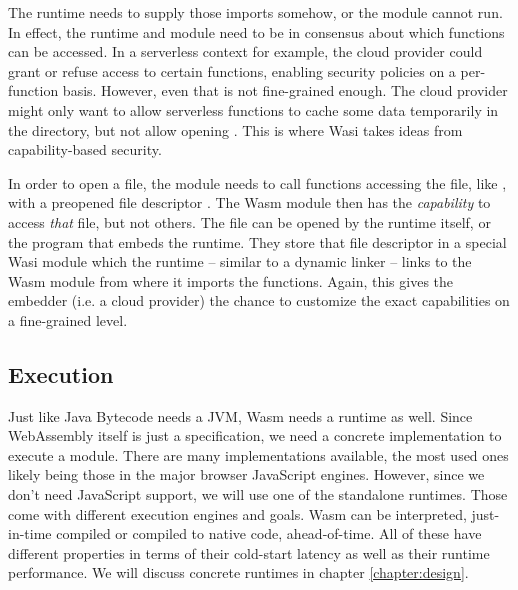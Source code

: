 The runtime needs to supply those imports somehow, or the module cannot run. In effect, the runtime and module need to be in consensus about which functions can be accessed. In a serverless context for example, the cloud provider could grant or refuse access to certain functions, enabling security policies on a per-function basis. However, even that is not fine-grained enough. The cloud provider might only want to allow serverless functions to cache some data temporarily in the  directory, but not allow opening . This is where Wasi takes ideas from capability-based security.

In order to open a file, the module needs to call functions accessing the file, like , with a preopened file descriptor \cite{Clark2019}. The Wasm module then has the \emph{capability} to access \emph{that} file, but not others. The file can be opened by the runtime itself, or the program that embeds the runtime. They store that file descriptor in a special Wasi module which the runtime -- similar to a dynamic linker -- links to the Wasm module from where it imports the functions. Again, this gives the embedder (i.e. a cloud provider) the chance to customize the exact capabilities on a fine-grained level.

\subsection{Execution}

Just like Java Bytecode needs a JVM, Wasm needs a runtime as well. Since WebAssembly itself is just a specification, we need a concrete implementation to execute a module. There are many implementations available, the most used ones likely being those in the major browser JavaScript engines. However, since we don't need JavaScript support, we will use one of the standalone runtimes. Those come with different execution engines and goals. Wasm can be interpreted, just-in-time compiled or compiled to native code, ahead-of-time. All of these have different properties in terms of their cold-start latency as well as their runtime performance. We will discuss concrete runtimes in chapter \ref{chapter:design}.
